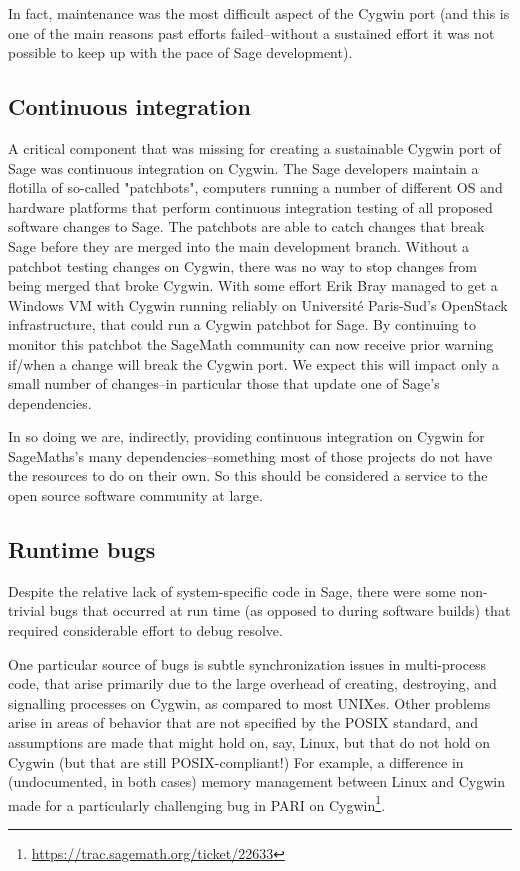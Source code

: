 In fact, maintenance was the most difficult aspect of the Cygwin port
(and this is one of the main reasons past efforts failed--without a
sustained effort it was not possible to keep up with the pace of Sage
development).

\subsection{Continuous integration}\label{continuous-integration}

A critical component that was missing for creating a sustainable Cygwin port of
Sage was continuous integration on Cygwin. The Sage developers maintain a
flotilla of so-called "patchbots", computers running a number of different OS
and hardware platforms that perform continuous integration testing of all
proposed software changes to Sage.  The patchbots are able to catch changes
that break Sage before they are merged into the main development branch.
Without a patchbot testing changes on Cygwin, there was no way to stop changes
from being merged that broke Cygwin. With some effort Erik Bray managed to get
a Windows VM with Cygwin running reliably on Université Paris-Sud's OpenStack
infrastructure, that could run a Cygwin patchbot for Sage. By continuing to
monitor this patchbot the SageMath community can now receive prior warning
if/when a change will break the Cygwin port. We expect this will impact only a
small number of changes--in particular those that update one of Sage's
dependencies.

In so doing we are, indirectly, providing continuous integration on
Cygwin for SageMaths's many dependencies--something most of those
projects do not have the resources to do on their own. So this should be
considered a service to the open source software community at large.


\subsection{Runtime bugs}\label{runtime-bugs}

Despite the relative lack of system-specific code in Sage, there were some
non-trivial bugs that occurred at run time (as opposed to during software
builds) that required considerable effort to debug resolve.

One particular source of bugs is subtle synchronization issues in multi-process
code, that arise primarily due to the large overhead of creating, destroying,
and signalling processes on Cygwin, as compared to most UNIXes.  Other problems
arise in areas of behavior that are not specified by the POSIX standard, and
assumptions are made that might hold on, say, Linux, but that do not hold on
Cygwin (but that are still POSIX-compliant!)  For example, a difference in
(undocumented, in both cases) memory management between Linux and Cygwin made
for a particularly challenging bug in PARI on
Cygwin\footnote{\url{https://trac.sagemath.org/ticket/22633}}.

